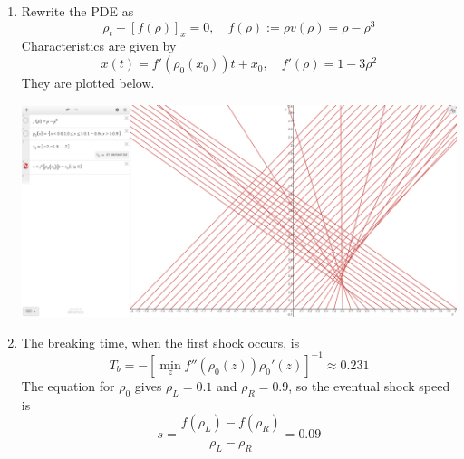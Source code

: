 \documentclass{article}
\newcommand{\sbr}[1]{\left[#1\right]}
\newcommand{\inv}{^{-1}}
\newcommand{\p}{\rho}
\begin{document}
\begin{enumerate}
\begin{enumerate}
	
	
	\item Rewrite the PDE as
	\[\p_t + [f(\p)]_x = 0,
	\quad f(\p) := \p v(\p) = \p - \p^3\]
	Characteristics are given by
	\[x(t) = f'(\p_0(x_0))t + x_0,
	\quad f'(\p) = 1 - 3\p^2\]
	They are plotted below.
	\begin{center}
		\includegraphics[scale=.3]{final 3a}
	\end{center}


	\item The breaking time, when the first shock occurs, is
	\[T_b = -\sbr{\min_zf''(\p_0(z))\p_0'(z)}\inv \approx 0.231\]
	The equation for $\p_0$ gives $\p_L=0.1$ and $\p_R=0.9$, so the eventual shock speed is
	\[s = \frac{f(\p_L)-f(\p_R)}{\p_L-\p_R} = 0.09\]
	
	
\end{enumerate}



\end{enumerate}
	
	
\end{document}
